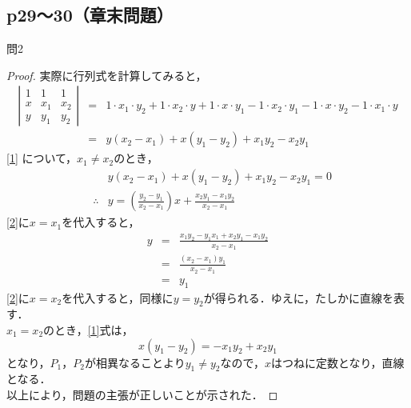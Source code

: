 \documentclass[dvipdfmx,uplatex,11pt]{jsarticle}
\theoremstyle{definition}
\begin{document}
\subsection{p29〜30（章末問題）}
%
%
%
問2\\
\noindent
\begin{leftbar}
\begin{proof}
実際に行列式を計算してみると，
\begin{eqnarray}
\left |
\begin{array}{ccc}
1 & 1 & 1 \\
x & x_1 & x_2 \\
y & y_1 & y_2 
\end{array}
\right |
& = & 1 \cdot x_1 \cdot y_2 +1 \cdot x_2 \cdot y + 1 \cdot x \cdot y_1 - 1 \cdot x_2 \cdot y_1 - 1 \cdot x \cdot y_2 - 1 \cdot x_1 \cdot y \\
\label{1}
& = & y(x_2 -x_1) + x ( y_1 - y_2 ) +x_1 y_2 - x_2 y_1
\end{eqnarray}
\eqref{1} について，$x_1 \neq x_2$のとき，
\begin{eqnarray}
& & y(x_2 -x_1) + x ( y_1 - y_2 ) +x_1 y_2 - x_2 y_1=0 \\
\label{2}
& \therefore &y=  \left( \frac{y_2 - y_1}{x_2 -x_1} \right)x  + \frac{x_2 y_1 - x_1 y_2 }{x_2 -x_1}
\end{eqnarray}
\eqref{2}に$x=x_1$を代入すると，
\begin{eqnarray}
y&=& \frac{x_1 y_2 -y_1 x_1 +x_2 y_1 - x_1 y_2}{x_2-x_1} \\
& = & \frac{(x_2 - x_1)y_1}{x_2 - x_1} \\
&=&y_1
\end{eqnarray}
\eqref{2}に$x=x_2$を代入すると，同様に$y=y_2$が得られる．ゆえに，たしかに直線を表す．\\
$x_1 = x_2$のとき，\eqref{1}式は，
\begin{equation}
x(y_1 - y_2) = -x_1 y_2 + x_2 y_1
\end{equation}
となり，$P_1$，$P_2$が相異なることより$y_1 \neq y_2$なので，$x$はつねに定数となり，直線となる．\\
以上により，問題の主張が正しいことが示された．
\end{proof}
\end{leftbar}

\newpage
%
\end{document}
